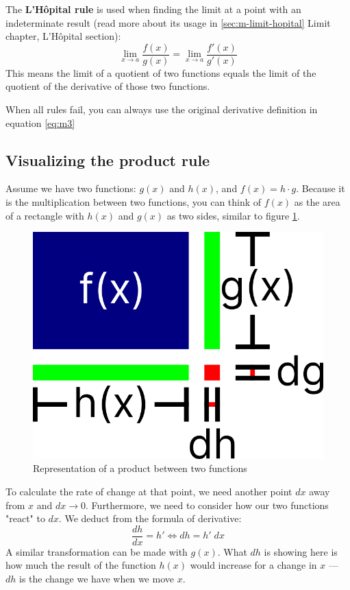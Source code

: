 The \textbf{L'Hôpital rule} is used when finding the limit at a point with an indeterminate result (read more about its usage in \ref{sec:m-limit-hopital} Limit chapter, L'Hôpital section):
\begin{equation}
    \lim_{x\to a} \frac{f(x)}{g(x)}
    = \lim_{x\to a} \frac{f'(x)}{g'(x)}
\end{equation}
This means the limit of a quotient of two functions equals the limit of the quotient of the derivative of those two functions.

When all rules fail, you can always use the original derivative definition in equation \ref{eq:m3}

\subsection{Visualizing the product rule}
Assume we have two functions: $g(x)$ and $h(x)$, and $f(x)=h\cdot g$. Because it is the multiplication between two functions, you can think of $f(x)$ as the area of a rectangle with $h(x)$ and $g(x)$ as two sides, similar to figure \ref{fig:m11}.
\begin{figure}
    \centering
    \includegraphics[width=0.5\linewidth]{math/11.png}
    \caption{Representation of a product between two functions}
    \label{fig:m11}
\end{figure}

To calculate the rate of change at that point, we need another point $dx$ away from $x$ and $dx\to0$. Furthermore, we need to consider how our two functions "react" to $dx$. We deduct from the formula of derivative:
\[
    \frac{dh}{dx} = h'
    \Leftrightarrow
    dh = h' \;dx
\]
A similar transformation can be made with $g(x)$. What $dh$ is showing here is how much the result of the function $h(x)$ would increase for a change in $x$ — $dh$ is the change we have when we move $x$.

